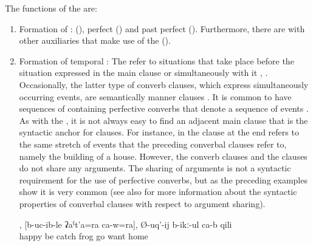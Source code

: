 The functions of the  are:
%
\begin{enumerate}
	\item	Formation of :  (), perfect () and past perfect (). Furthermore, there are  with other auxiliaries that make use of the  ().

	\item	Formation of temporal : The  refer to situations that take place before the situation expressed in the main clause or simultaneously with it , . Occasionally, the latter type of converb clauses, which express simultaneously occurring events, are semantically manner clauses . It is common to have sequences of  containing perfective converbs that denote a sequence of events . As with the , it is not always easy to find an adjacent main clause that is the syntactic anchor for  clauses. For instance, in  the  clause at the end refers to the same stretch of events that the preceding converbal clauses refer to, namely the building of a house. However, the converb clauses and the  clauses do not share any arguments. The sharing of arguments is not a syntactic requirement for the use of perfective converbs, but as the preceding examples  show it is very common (see also  for more information about the syntactic properties of converbal clauses with respect to argument sharing).
	\begin{exe}
		\ex	\label{ex:‎He got happy, caught his frog, and wants to go home}
		\gll	[razi	Ø-iχ-ub-le],	[b-uc-ib-le	ʡaˁt'a=ra	ca-w=ra],	Ø-uq'-ij	b-ikː-ul	ca-b	qili\\
			happy	be	catch	frog		go	want		home\\
		\glt	{}


\end{exe}
\end{enumerate}
